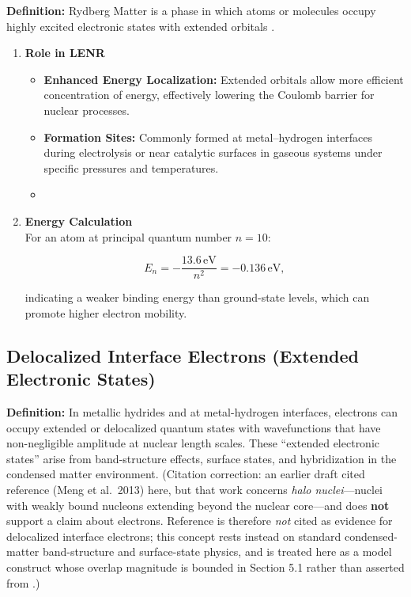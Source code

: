 \documentclass[11pt,a4paper]{article}
\begin{document}
\textbf{Definition:} Rydberg Matter is a phase in which atoms or molecules occupy highly excited electronic states with extended orbitals \citep{holmlid2015}.

\begin{enumerate}
\def\labelenumi{\arabic{enumi}.}
\item
  \textbf{Role in LENR}

  \begin{itemize}
    \item
    \textbf{Enhanced Energy Localization:} Extended orbitals allow more efficient concentration of energy, effectively lowering the Coulomb barrier for nuclear processes.\\
  \item
    \textbf{Formation Sites:} Commonly formed at metal--hydrogen interfaces during electrolysis or near catalytic surfaces in gaseous systems under specific pressures and temperatures.\\
  \item
  \end{itemize}
\item
  \textbf{Energy Calculation}\\
  For an atom at principal quantum number $n = 10$:

  \begin{equation}
E_n = -\frac{13.6\,\mathrm{eV}}{n^2} = -0.136\,\mathrm{eV},
\end{equation}

  indicating a weaker binding energy than ground-state levels, which can promote higher electron mobility.
\end{enumerate}

\subsection{Delocalized Interface Electrons (Extended Electronic States)}

\textbf{Definition:} In metallic hydrides and at metal-hydrogen interfaces, electrons can occupy extended or delocalized quantum states with wavefunctions that have non-negligible amplitude at nuclear length scales. These ``extended electronic states'' arise from band-structure effects, surface states, and hybridization in the condensed matter environment. (Citation correction: an earlier draft cited reference \citep{czerski2023} (Meng et al.~2013) here, but that work concerns \emph{halo nuclei}---nuclei with weakly bound nucleons extending beyond the nuclear core---and does \textbf{not} support a claim about electrons. Reference \citep{czerski2023} is therefore \emph{not} cited as evidence for delocalized interface electrons; this concept rests instead on standard condensed-matter band-structure and surface-state physics, and is treated here as a model construct whose overlap magnitude is bounded in Section 5.1 rather than asserted from \citep{czerski2023}.)
\end{document}
